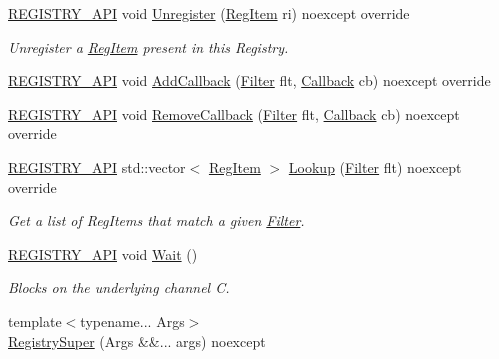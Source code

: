 \begin{DoxyCompactItemize}
\hyperlink{registry__core_8hpp_a8e344a5f1098eda0aa0bc66b1c45ace4}{R\+E\+G\+I\+S\+T\+R\+Y\+\_\+\+A\+PI} void \hyperlink{classregistry_1_1RegistrySuper_a3d35e055e1e69a00074701356e3e700f}{Unregister} (\hyperlink{classregistry_1_1RegItem}{Reg\+Item} ri) noexcept override
\begin{DoxyCompactList}\small\item\em Unregister a \hyperlink{classregistry_1_1RegItem}{Reg\+Item} present in this Registry. \end{DoxyCompactList}\item 
\hyperlink{registry__core_8hpp_a8e344a5f1098eda0aa0bc66b1c45ace4}{R\+E\+G\+I\+S\+T\+R\+Y\+\_\+\+A\+PI} void \hyperlink{classregistry_1_1RegistrySuper_a80e234502449509e0c9ce75e787ef974}{Add\+Callback} (\hyperlink{classregistry_1_1Filter}{Filter} flt, \hyperlink{classregistry_1_1AbstractRegistry_a08a798ca9ca1c4c983ebd2386ca3c315}{Callback} cb) noexcept override
\item 
\hyperlink{registry__core_8hpp_a8e344a5f1098eda0aa0bc66b1c45ace4}{R\+E\+G\+I\+S\+T\+R\+Y\+\_\+\+A\+PI} void \hyperlink{classregistry_1_1RegistrySuper_a61948ba29418a844f1b2c9b1259e26bf}{Remove\+Callback} (\hyperlink{classregistry_1_1Filter}{Filter} flt, \hyperlink{classregistry_1_1AbstractRegistry_a08a798ca9ca1c4c983ebd2386ca3c315}{Callback} cb) noexcept override
\item 
\hyperlink{registry__core_8hpp_a8e344a5f1098eda0aa0bc66b1c45ace4}{R\+E\+G\+I\+S\+T\+R\+Y\+\_\+\+A\+PI} std\+::vector$<$ \hyperlink{classregistry_1_1RegItem}{Reg\+Item} $>$ \hyperlink{classregistry_1_1RegistrySuper_a83240eacc385688b32998c1e83d086c5}{Lookup} (\hyperlink{classregistry_1_1Filter}{Filter} flt) noexcept override
\begin{DoxyCompactList}\small\item\em Get a list of Reg\+Items that match a given \hyperlink{classregistry_1_1Filter}{Filter}. \end{DoxyCompactList}\item 
\hyperlink{registry__core_8hpp_a8e344a5f1098eda0aa0bc66b1c45ace4}{R\+E\+G\+I\+S\+T\+R\+Y\+\_\+\+A\+PI} void \hyperlink{classregistry_1_1RegistrySuper_a4fce4d869236f2b99e8d461311facc76}{Wait} ()
\begin{DoxyCompactList}\small\item\em Blocks on the underlying channel C. \end{DoxyCompactList}\item 
{\footnotesize template$<$typename... Args$>$ }\\\hyperlink{classregistry_1_1RegistrySuper_a91a93b354ebf303d24b0821a252c1ccf}{Registry\+Super} (Args \&\&... args) noexcept
\end{DoxyCompactItemize}
